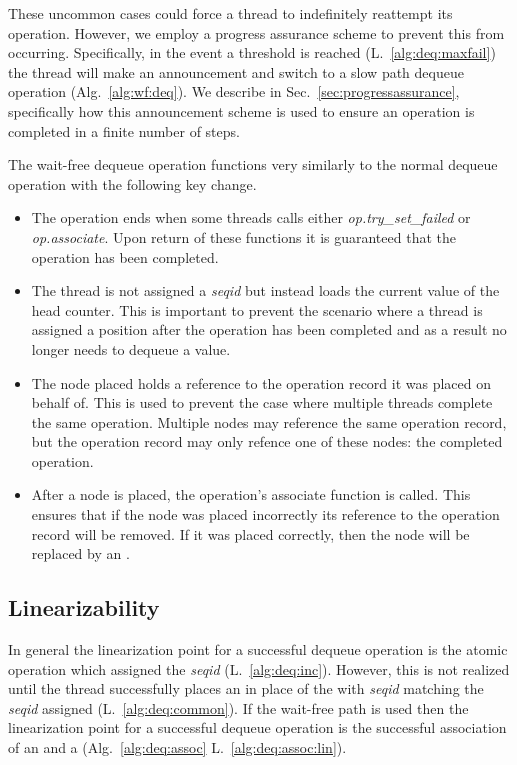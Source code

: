 
These uncommon cases could force a thread to indefinitely reattempt its operation.
However, we employ a progress assurance scheme to prevent this from occurring.
Specifically, in the event a threshold is reached (L.~\ref{alg:deq:maxfail}) the thread will make an announcement and switch to a slow path dequeue operation (Alg.~\ref{alg:wf:deq}). We describe in Sec.~\ref{sec:progressassurance}, specifically how this announcement scheme is used to ensure an operation is completed in a finite number of steps.

The wait-free dequeue operation functions very similarly to the normal dequeue operation with the following key change.
\begin{itemize}
\item The operation ends when some threads calls either \emph{op.try\_set\_failed} or \emph{op.associate}.
Upon return of these functions it is guaranteed that the operation has been completed.
\item The thread is not assigned a \emph{seqid} but instead loads the current value of the head counter.
This is important to prevent the scenario where a thread is assigned a position after the operation has been completed and as a result no longer needs to dequeue a value.
\item The node placed holds a reference to the operation record it was placed on behalf of.
This is used to prevent the case where multiple threads complete the same operation.
Multiple nodes may reference the same operation record, but the operation record may only refence one of these nodes: the completed operation.
\item After a node is placed, the operation's associate function is called.
This ensures that if the node was placed incorrectly its reference to the operation record will be removed.
If it was placed correctly, then the node will be replaced by an .

\end{itemize}


\subsection{Linearizability}
In general the linearization point for a successful dequeue operation is the atomic  operation which assigned the \emph{seqid} (L.~\ref{alg:deq:inc}).
However, this is not realized until the thread successfully places an  in place of the  with \emph{seqid} matching the \emph{seqid} assigned (L.~\ref{alg:deq:common}).
If the wait-free path is used then the linearization point for a successful dequeue operation is the successful association of an  and a  (Alg.~\ref{alg:deq:assoc} L.~\ref{alg:deq:assoc:lin}).

